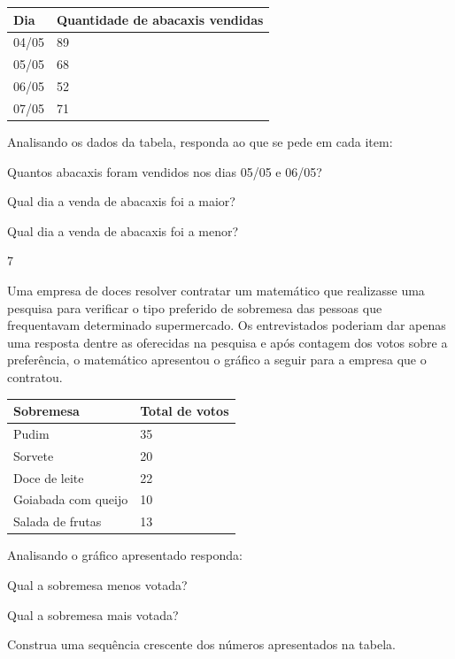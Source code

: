 \begin{escolha}
\begin{escolha}
\begin{longtable}[]{@{}ll@{}}
\toprule
Dia & Quantidade de abacaxis vendidas\tabularnewline
\midrule
\endhead
04/05 & 89\tabularnewline
05/05 & 68\tabularnewline
06/05 & 52\tabularnewline
07/05 & 71\tabularnewline
\bottomrule
\end{longtable}

Analisando os dados da tabela, responda ao que se pede em cada item:

\begin{escolha}
  \item
  Quantos abacaxis foram vendidos nos dias 05/05 e 06/05?

\item
  Qual dia a venda de abacaxis foi a maior?

\item
  Qual dia a venda de abacaxis foi a menor?
\end{escolha}

\num{7}

Uma empresa de doces resolver contratar um matemático que realizasse uma
pesquisa para verificar o tipo preferido de sobremesa das pessoas que
frequentavam determinado supermercado. Os entrevistados poderiam dar
apenas uma resposta dentre as oferecidas na pesquisa e após contagem dos
votos sobre a preferência, o matemático apresentou o gráfico a seguir
para a empresa que o contratou.

\begin{longtable}[]{@{}ll@{}}
\toprule
Sobremesa & Total de votos\tabularnewline
\midrule
\endhead
Pudim & 35\tabularnewline
Sorvete & 20\tabularnewline
Doce de leite & 22\tabularnewline
Goiabada com queijo & 10\tabularnewline
Salada de frutas & 13\tabularnewline
\bottomrule
\end{longtable}

Analisando o gráfico apresentado responda:

\begin{escolha}

\item
  Qual a sobremesa menos votada?

\item
  Qual a sobremesa mais votada?

\item
  Construa uma sequência crescente dos números apresentados na tabela.


\end{escolha}
\end{escolha}
\end{escolha}
